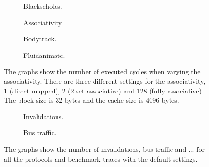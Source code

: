 \begin{figure}[H]
    \centering
    \begin{subfigure}[b]{0.33\textwidth}
        \centering
        \caption{Blackscholes.}
        \label{fig:associativity_blackscholes_advanced}
    \end{subfigure}%
    \hfill
    \begin{subfigure}[b]{0.33\textwidth}
        \centering
        Associativity\par\medskip
        \caption{Bodytrack.}
        \label{fig:associativity_bodytrack_advanced}
    \end{subfigure}%
    \hfill
    \begin{subfigure}[b]{0.33\textwidth}
        \centering
        \caption{Fluidanimate.}
        \label{fig:associativity_fluidanimate_advanced}
    \end{subfigure}
    \hfill
    \caption{The graphs show the number of executed cycles when varying the associativity. There are three different settings for the associativity, 1 (direct mapped), 2 (2-set-associative) and 128 (fully associative). The block size is 32 bytes and the cache size is 4096 bytes.}
    \label{fig:associativity_advanced}
\end{figure}

\begin{figure}[H]
    \centering
    \begin{subfigure}[b]{0.33\textwidth}
        \centering
        \caption{Invalidations.}
        \label{fig:invalidations}
    \end{subfigure}%
    \hfill
    \begin{subfigure}[b]{0.33\textwidth}
        \centering
        \caption{Bus traffic.}
        \label{fig:bus_traffic}
    \end{subfigure}%
    \hfill
    \begin{subfigure}[b]{0.33\textwidth}
        \centering
        \caption{}
        \label{fig:}
    \end{subfigure}
    \hfill
    \caption{The graphs show the number of invalidations, bus traffic and ... for all the protocols and benchmark traces with the default settings.}
    \label{fig:}
\end{figure}

